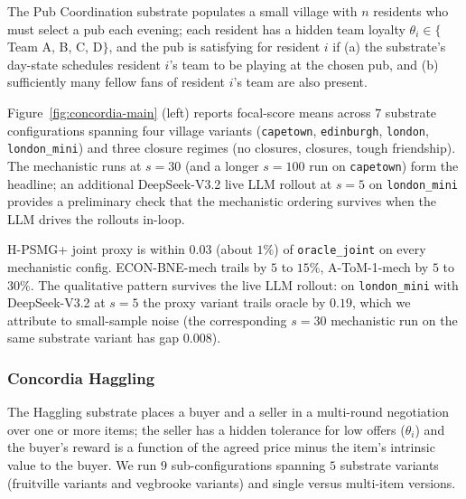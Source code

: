 \documentclass{article}
\def\textsuperscript#1{#1}%
\begin{document}
The Pub Coordination substrate populates a small village with $n$ residents
who must select a pub each evening; each resident has a hidden team loyalty
$\theta_i \in \{$Team A, B, C, D$\}$, and the pub is satisfying for resident
$i$ if (a) the substrate's day-state schedules resident $i$'s team to be
playing at the chosen pub, and (b) sufficiently many fellow fans of resident
$i$'s team are also present.

Figure~\ref{fig:concordia-main} (left) reports focal-score means across $7$
substrate configurations spanning four village variants (\texttt{capetown},
\texttt{edinburgh}, \texttt{london}, \texttt{london\_mini}) and three closure
regimes (no closures, closures, tough friendship). The mechanistic runs at
$s = 30$ (and a longer $s = 100$ run on \texttt{capetown}) form the
headline; an additional DeepSeek-V3.2 live LLM rollout at $s = 5$ on
\texttt{london\_mini} provides a preliminary check that the mechanistic
ordering survives when the LLM drives the rollouts in-loop.

H-PSMG\textsuperscript{+} joint proxy is within $0.03$ (about $1\%$) of
\texttt{oracle\_joint} on every mechanistic config. ECON-BNE-mech trails by
$5$ to $15\%$, A-ToM-1-mech by $5$ to $30\%$. The qualitative pattern survives
the live LLM rollout: on \texttt{london\_mini} with DeepSeek-V3.2 at $s = 5$
the proxy variant trails oracle by $0.19$, which we attribute to small-sample
noise (the corresponding $s = 30$ mechanistic run on the same substrate
variant has gap $0.008$).

\subsubsection{Concordia Haggling}

The Haggling substrate places a buyer and a seller in a multi-round negotiation
over one or more items; the seller has a hidden tolerance for low offers
($\theta_i$) and the buyer's reward is a function of the agreed price minus
the item's intrinsic value to the buyer. We run $9$ sub-configurations spanning
$5$ substrate variants (fruitville variants and vegbrooke variants) and single
versus multi-item versions.
\end{document}
